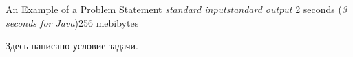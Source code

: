 \begin{problem}{An Example of a Problem Statement}
{\textsl{standard input}}{\textsl{standard output}}
{2 seconds (\textsl{3 seconds for Java})}{256 mebibytes}{}

Здесь написано условие задачи.

\InputFile



\OutputFile


\Examples

\begin{example}
%
\end{example}

\begin{examplewide}
%
\end{examplewide}

\begin{examplethree}
%
\end{examplethree}


\end{problem}
